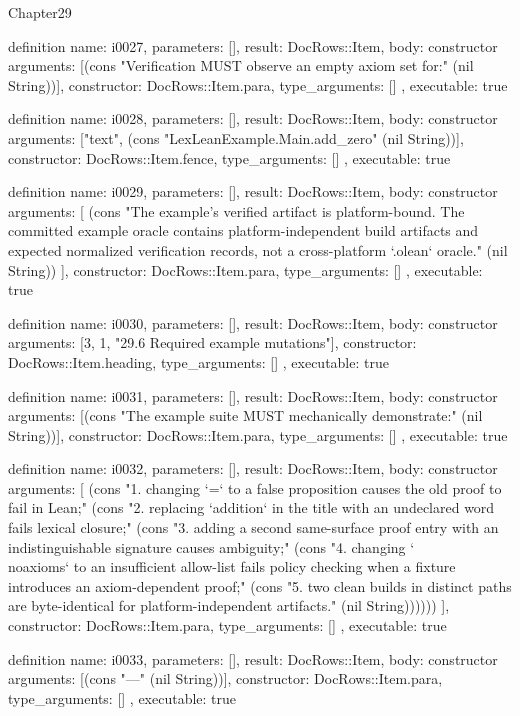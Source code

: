 \begin{lexlean}{Chapter29}
\begin{semanticmodule}
definition{
  name: i0027,
  parameters: [],
  result: DocRows::Item,
  body: constructor{
    arguments: [(cons "Verification MUST observe an empty axiom set for:" (nil String))],
    constructor: DocRows::Item.para,
    type_arguments: []
  },
  executable: true
}

definition{
  name: i0028,
  parameters: [],
  result: DocRows::Item,
  body: constructor{
    arguments: ["text", (cons "LexLeanExample.Main.add_zero" (nil String))],
    constructor: DocRows::Item.fence,
    type_arguments: []
  },
  executable: true
}

definition{
  name: i0029,
  parameters: [],
  result: DocRows::Item,
  body: constructor{
    arguments: [
      (cons "The example's verified artifact is platform-bound. The committed example oracle contains platform-independent build artifacts and expected normalized verification records, not a cross-platform `.olean` oracle." (nil String))
    ],
    constructor: DocRows::Item.para,
    type_arguments: []
  },
  executable: true
}

definition{
  name: i0030,
  parameters: [],
  result: DocRows::Item,
  body: constructor{
    arguments: [3, 1, "29.6 Required example mutations"],
    constructor: DocRows::Item.heading,
    type_arguments: []
  },
  executable: true
}

definition{
  name: i0031,
  parameters: [],
  result: DocRows::Item,
  body: constructor{
    arguments: [(cons "The example suite MUST mechanically demonstrate:" (nil String))],
    constructor: DocRows::Item.para,
    type_arguments: []
  },
  executable: true
}

definition{
  name: i0032,
  parameters: [],
  result: DocRows::Item,
  body: constructor{
    arguments: [
      (cons "1. changing `=` to a false proposition causes the old proof to fail in Lean;" (cons "2. replacing `addition` in the title with an undeclared word fails lexical closure;" (cons "3. adding a second same-surface proof entry with an indistinguishable signature causes ambiguity;" (cons "4. changing `\\noaxioms` to an insufficient allow-list fails policy checking when a fixture introduces an axiom-dependent proof;" (cons "5. two clean builds in distinct paths are byte-identical for platform-independent artifacts." (nil String))))))
    ],
    constructor: DocRows::Item.para,
    type_arguments: []
  },
  executable: true
}

definition{
  name: i0033,
  parameters: [],
  result: DocRows::Item,
  body: constructor{
    arguments: [(cons "---" (nil String))],
    constructor: DocRows::Item.para,
    type_arguments: []
  },
  executable: true
}
\end{semanticmodule}
\end{lexlean}
